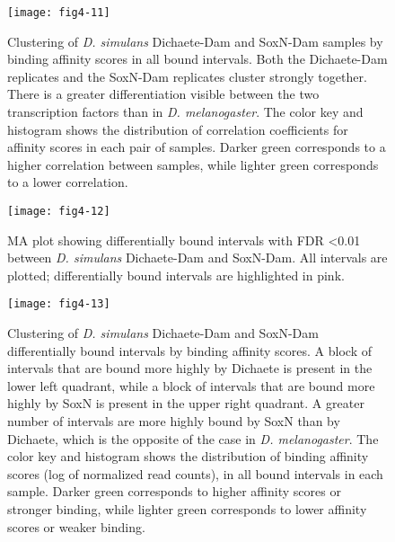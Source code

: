 \begin{figure}
\centering
\texttt{[image: fig4-11]}
\caption[Clustering of \emph{D. simulans} Dichaete-Dam and SoxN-Dam samples by binding affinity scores in all bound intervals]{Clustering of \emph{D. simulans} Dichaete-Dam and SoxN-Dam samples by binding affinity scores in all bound intervals. Both the Dichaete-Dam replicates and the SoxN-Dam replicates cluster strongly together. There is a greater differentiation visible between the two transcription factors than in \emph{D. melanogaster}. The color key and histogram shows the distribution of correlation coefficients for affinity scores in each pair of samples. Darker green corresponds to a higher correlation between samples, while lighter green corresponds to a lower correlation.}
\label{Figure 4.11}
\end{figure}

\begin{figure}
\centering
\texttt{[image: fig4-12]}
\caption[Differentially bound intervals with FDR \textless 0.01 between \emph{D. simulans} Dichaete-Dam and SoxN-Dam]{MA plot showing differentially bound intervals with FDR \textless 0.01 between \emph{D. simulans} Dichaete-Dam and SoxN-Dam. All intervals are plotted; differentially bound intervals are highlighted in pink.}
\label{Figure 4.12}
\end{figure}

\begin{figure}
\centering
\texttt{[image: fig4-13]}
\caption[Clustering of \emph{D. simulans} Dichaete-Dam and SoxN-Dam differentially bound intervals by binding affinity scores]{Clustering of \emph{D. simulans} Dichaete-Dam and SoxN-Dam differentially bound intervals by binding affinity scores. A block of intervals that are bound more highly by Dichaete is present in the lower left quadrant, while a block of intervals that are bound more highly by SoxN is present in the upper right quadrant. A greater number of intervals are more highly bound by SoxN than by Dichaete, which is the opposite of the case in \emph{D. melanogaster}. The color key and histogram shows the distribution of binding affinity scores (log of normalized read counts), in all bound intervals in each sample. Darker green corresponds to higher affinity scores or stronger binding, while lighter green corresponds to lower affinity scores or weaker binding.}
\label{Figure 4.13}
\end{figure}

